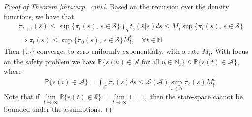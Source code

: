 \documentclass{LMCS}
\begin{document}
\begin{proof}[Proof of Theorem \ref{thm:exp_conv}]
Based on the recursion over the density functions, we have that 
\begin{align*}
& \pi_{t+1}(\bar s)\le\sup\{\pi_{t}(s),\,s\in\mathcal S\}\int_{\mathcal S}t_{\mathfrak s}(\bar s|s)ds\le M_{\mathfrak f} \sup\{\pi_{t}(s),\,s\in\mathcal S\}\\
&\Rightarrow \pi_{t}(s)\le \sup\{\pi_0(s),\,s\in\mathcal S\}M_{\mathfrak f}^t, \quad \forall t\in\mathbb N.
\end{align*}
Then $\{\pi_t\}$ converges to zero uniformly exponentially, with a rate $M_{\mathfrak f}$. 
With focus on the safety problem we have $\mathbb P\{s(u)\in \mathcal A \text{ for all } u\in\mathbb N_t\}\le \mathbb P\{s(t)\in \mathcal A \}$, where
\begin{align*}
& \mathbb P\{s(t)\in \mathcal A \} = \int_{\mathcal A} \pi_{t}(s) ds \le \mathcal L(\mathcal A)\sup_{s\in\mathcal S}\pi_{0}(s)M_{\mathfrak f}^t.
\end{align*}
Note that if 
$
\lim\limits_{t\rightarrow\infty}\mathbb P\{s(t)\in \mathcal S\} = \lim\limits_{t\rightarrow\infty} 1 = 1,
$
then the state-space cannot be bounded under the assumptions. 
\end{proof}


\newpage
\end{document}
